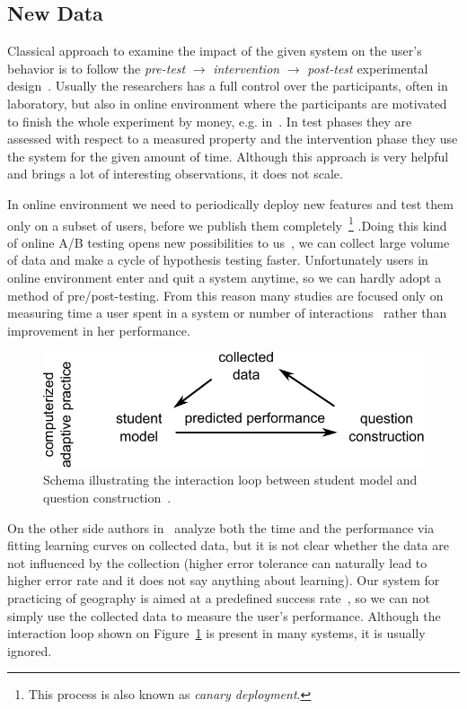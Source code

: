 \documentclass[table,color,cover,twoside,nolot,nolof]{fithesis3/fithesis3}
\begin{document}
\subsection{New Data}

Classical approach to examine the impact of the given system on the user's
behavior is to follow the \emph{pre-test} $\rightarrow$ \emph{intervention}
$\rightarrow$ \emph{post-test} experimental design~\cite{dimitrov2003pretest}.
Usually the researchers has a full control over the participants, often in
laboratory, but also in online environment where the participants are motivated
to finish the whole experiment by money, e.g. in~\cite{maass2015how}. In test
phases they are assessed with respect to a measured property and the
intervention phase they use the system for the given amount of time. Although
this approach is very helpful and brings a lot of interesting observations, it
does not scale.

In online environment we need to periodically deploy new features and
test them only on a subset of users, before we publish them
completely~\footnote{This process is also known as \emph{canary deployment}.}
.Doing this kind of online A/B testing opens new possibilities to
us~\cite{stamper2012rise}, we can collect large volume of data and make a
cycle of hypothesis testing faster. Unfortunately users in online environment
enter and quit a system anytime, so we can hardly adopt a method of
pre/post-testing. From this reason many studies are focused only on measuring
time a user spent in a system or number of
interactions~\cite{papousek2015impact,monterrat2015player}
rather than improvement in her performance.

\begin{figure}[h]
	\begin{center}
		\includegraphics[width=.7\textwidth]{figure/interaction_loop}
	\end{center}
	\caption{Schema illustrating the interaction loop between student model and
		question construction~\cite{niznan2015exploring}.}
	\label{figure:interaction_loop}
\end{figure}

On the other side authors in~\cite{lomas2013optimizing} analyze both the time
and the performance via fitting learning curves on collected data, but it is
not clear whether the data are not influenced by the collection (higher error
tolerance can naturally lead to higher error rate and it does not say anything
about learning).  Our system for practicing of geography is aimed at a
predefined success rate~\cite{papousek2014adaptive}, so we can not simply use
the collected data to measure the user's performance. Although the interaction loop
shown on Figure~\ref{figure:interaction_loop} is present in many systems, it is
usually ignored.
\end{document}
